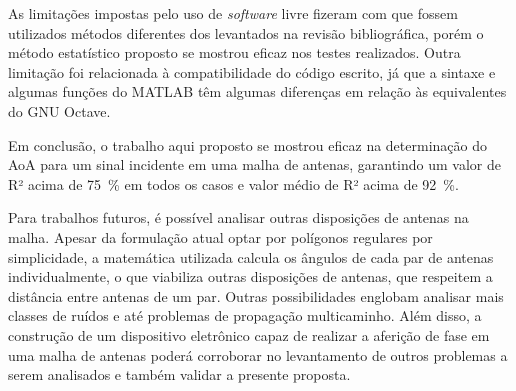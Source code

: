 As limitações impostas pelo uso de \textit{software} livre fizeram com que fossem utilizados métodos diferentes dos levantados na revisão bibliográfica, porém o método estatístico proposto se mostrou eficaz nos testes realizados.
Outra limitação foi relacionada à compatibilidade do código escrito, já que a sintaxe e algumas funções do MATLAB têm algumas diferenças em relação às equivalentes do GNU Octave.

Em conclusão, o trabalho aqui proposto se mostrou eficaz na determinação do \ac{AoA} para um sinal incidente em uma malha de antenas, garantindo um valor de R² acima de \qty{75}{\percent} em todos os casos e valor médio de R² acima de \qty{92}{\percent}.

Para trabalhos futuros, é possível analisar outras disposições de antenas na malha.
Apesar da formulação atual optar por polígonos regulares por simplicidade, a matemática utilizada calcula os ângulos de cada par de antenas individualmente, o que viabiliza outras disposições de antenas, que respeitem a distância entre antenas de um par.
Outras possibilidades englobam analisar mais classes de ruídos e até problemas de propagação multicaminho.
Além disso, a construção de um dispositivo eletrônico capaz de realizar a aferição de fase em uma malha de antenas poderá corroborar no levantamento de outros problemas a serem analisados e também validar a presente proposta.
